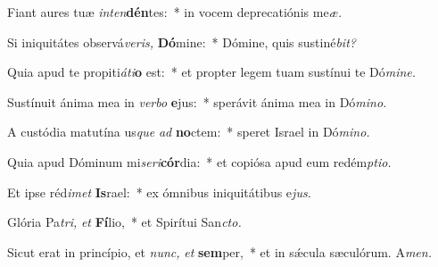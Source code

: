 \item Fiant aures tuæ \textit{inten}\textbf{dén}tes:~* in vocem deprecatiónis me\textit{æ.}
\item Si iniquitátes observá\textit{veris,} \textbf{Dó}mine:~* Dómine, quis sustiné\textit{bit?}
\item Quia apud te propiti\tinyhspace\textit{áti}\textbf{o} est:~* et propter legem tuam sustínui te Dó\textit{mine.}
\item Sustínuit ánima mea in \textit{verbo} \textbf{e}jus:~* sperávit ánima mea in Dó\textit{mino.}
\item A custódia matutína us\tinyhspace\textit{que} \textit{ad} \textbf{no}ctem:~* speret Israel in Dó\textit{mino.}
\item Quia apud Dóminum mi\textit{seri}\textbf{cór}dia:~* et copiósa apud eum redém\textit{ptio.}
\item Et ipse réd\tinyhspace\textit{imet} \textbf{Is}rael:~* ex ómnibus iniquitátibus e\tinyhspace\textit{jus.}
\item Glória Pa\tinyhspace\textit{tri,} \textit{et} \textbf{Fí}lio,~* et Spirítui San\tinyhspace\textit{cto.}
\item Sicut erat in princípio, et \textit{nunc,} \textit{et} \textbf{sem}per,~* et in sǽcula sæculórum. A\textit{men.}